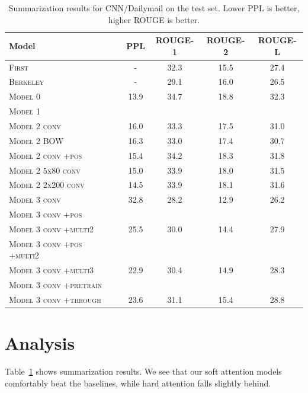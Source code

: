 \documentclass[12pt]{report}
\begin{document}
\begin{table}[h]
\centering
\begin{tabular}{llcccc}
 \toprule
 Model &  & PPL & ROUGE-1 & ROUGE-2 & ROUGE-L \\
 \midrule
\textsc{First} & & - & 32.3 & 15.5 & 27.4 \\
\textsc{Berkeley} & & - & 29.1 & 16.0 & 26.5 \\
\midrule
\textsc{Model 0} & & 13.9 & 34.7 & 18.8 & 32.3 \\
\midrule
 \textsc{Model 1} & & \\
\midrule
\textsc{Model 2 conv} & & 16.0 & 33.3 & 17.5 & 31.0 \\
\textsc{Model 2 BOW} & & 16.3 & 33.0 & 17.4 & 30.7 \\
\textsc{Model 2 conv +pos} & & 15.4 & 34.2 & 18.3 & 31.8 \\
\textsc{Model 2 5x80 conv} & & 15.0 & 33.9 & 18.0 & 31.5 \\
\textsc{Model 2 2x200 conv} & & 14.5 & 33.9 & 18.1 & 31.6 \\
\midrule
\textsc{Model 3 conv} & & 32.8 & 28.2 & 12.9 & 26.2 \\
\textsc{Model 3 conv +pos} & &  \\
\textsc{Model 3 conv +multi2} & & 25.5 & 30.0 & 14.4 & 27.9 \\
\textsc{Model 3 conv +pos +multi2} & &  \\
\textsc{Model 3 conv +multi3} & & 22.9 & 30.4 & 14.9 & 28.3 \\
\textsc{Model 3 conv +pretrain} & & \\
\textsc{Model 3 conv +through} & & 23.6 & 31.1 & 15.4 & 28.8 \\
 \bottomrule
\end{tabular}
\caption{Summarization results for CNN/Dailymail on the test set. Lower PPL is better, higher ROUGE is better.}
\label{table:summary}
\end{table}


\section{Analysis}


Table~\ref{table:summary} shows summarization results. We see that our soft attention models comfortably beat the baselines, while hard attention falls slightly behind.
\end{document}
